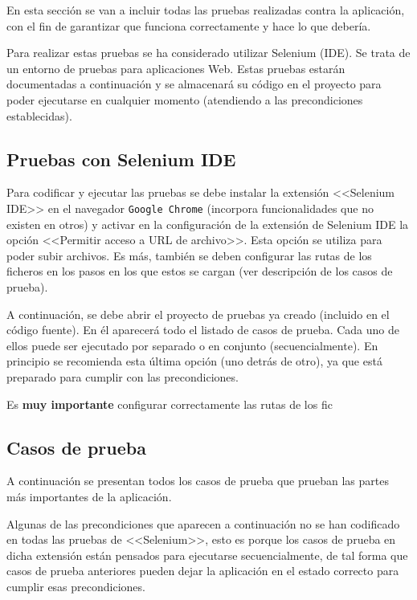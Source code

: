 En esta sección se van a incluir todas las pruebas realizadas contra la
aplicación, con el fin de garantizar que funciona correctamente y hace lo que
debería.

Para realizar estas pruebas se ha considerado utilizar Selenium (IDE). Se trata
de un entorno de pruebas para aplicaciones Web. Estas pruebas estarán
documentadas a continuación y se almacenará su código en el proyecto para poder
ejecutarse en cualquier momento (atendiendo a las precondiciones establecidas).

\subsection{Pruebas con Selenium IDE}

Para codificar y ejecutar las pruebas se debe instalar la extensión <<Selenium
IDE>> en el navegador \texttt{Google Chrome} (incorpora funcionalidades que no
existen en otros) y activar en la configuración de la extensión de Selenium IDE
la opción <<Permitir acceso a URL de archivo>>. Esta opción se utiliza para
poder subir archivos. Es más, también se deben configurar las rutas de los
ficheros en los pasos en los que estos se cargan (ver descripción de los casos de prueba).

A continuación, se debe abrir el proyecto de pruebas ya creado (incluido en el
código fuente). En él aparecerá todo el listado de casos de prueba. Cada uno de
ellos puede ser ejecutado por separado o en conjunto (secuencialmente). En
principio se recomienda esta última opción (uno detrás de otro), ya que está
preparado para cumplir con las precondiciones.

Es \textbf{muy importante} configurar correctamente las rutas de los fic


\subsection{Casos de prueba}

A continuación se presentan todos los casos de prueba que prueban las partes más
importantes de la aplicación.

Algunas de las precondiciones que aparecen a continuación no se han codificado
en todas las pruebas de <<Selenium>>, esto es porque los casos de prueba en
dicha extensión están pensados para ejecutarse secuencialmente, de tal forma que
casos de prueba anteriores pueden dejar la aplicación en el estado correcto para
cumplir esas precondiciones.

